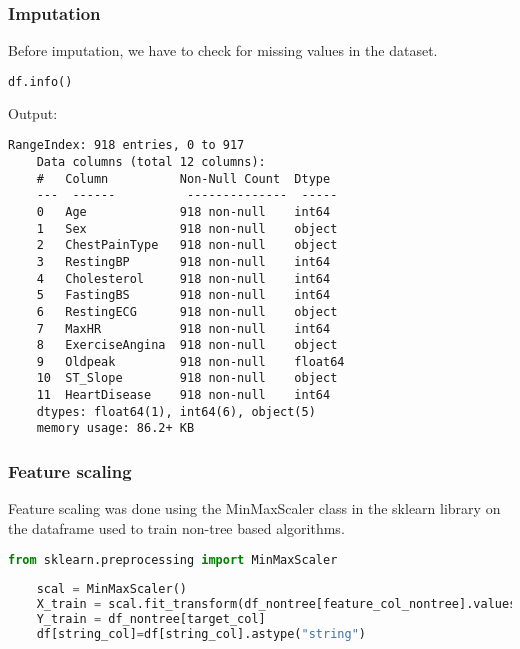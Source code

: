 \subsubsection{Imputation}
Before imputation, we have to check for missing values in the dataset.
\begin{lstlisting}[language=Python, caption=Dataset information]
	df.info()\end{lstlisting}
Output:
\begin{lstlisting}[numbers=none]
	RangeIndex: 918 entries, 0 to 917
	Data columns (total 12 columns):
	#   Column          Non-Null Count  Dtype  
	---  ------          --------------  -----  
	0   Age             918 non-null    int64  
	1   Sex             918 non-null    object 
	2   ChestPainType   918 non-null    object 
	3   RestingBP       918 non-null    int64  
	4   Cholesterol     918 non-null    int64  
	5   FastingBS       918 non-null    int64  
	6   RestingECG      918 non-null    object 
	7   MaxHR           918 non-null    int64  
	8   ExerciseAngina  918 non-null    object 
	9   Oldpeak         918 non-null    float64
	10  ST_Slope        918 non-null    object 
	11  HeartDisease    918 non-null    int64  
	dtypes: float64(1), int64(6), object(5)
	memory usage: 86.2+ KB
\end{lstlisting}


\subsubsection{Feature scaling}
Feature scaling was done using the MinMaxScaler class in the sklearn library on the dataframe used to train non-tree based algorithms.

\begin{lstlisting}[language=Python, caption={Scaling with MinMaxScaler}]
	from sklearn.preprocessing import MinMaxScaler
	
	scal = MinMaxScaler()
	X_train = scal.fit_transform(df_nontree[feature_col_nontree].values)
	Y_train = df_nontree[target_col]
	df[string_col]=df[string_col].astype("string")
\end{lstlisting}

